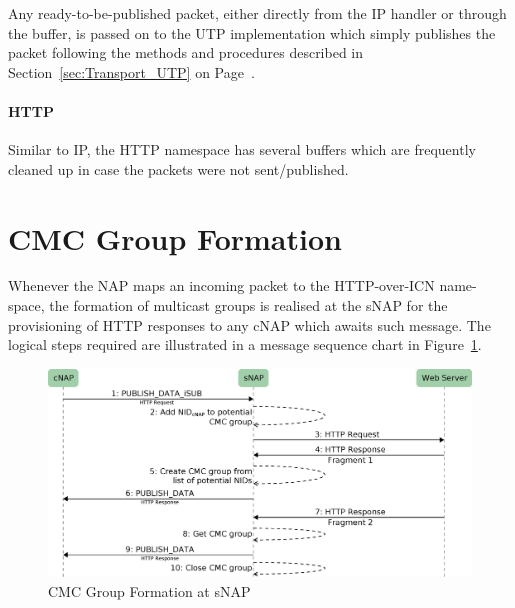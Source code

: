 \documentclass[a4paper,11pt,titlepage]{report}
\begin{document}
Any ready-to-be-published packet, either directly from the IP handler or through the buffer, is passed on to the \ac{UTP} implementation which simply publishes the packet following the methods and procedures described in Section~\ref{sec:Transport_UTP} on Page~\pageref{sec:Transport_UTP}.

\paragraph{HTTP}
Similar to IP, the HTTP namespace has several buffers which are frequently cleaned up in case the packets were not sent/published.
\section{\acl{CMC} Group Formation}
Whenever the NAP maps an incoming packet to the HTTP-over-ICN name-space, the formation of multicast groups is realised at the \ac{sNAP} for the provisioning of HTTP responses to any \ac{cNAP} which awaits such message. The logical steps required are illustrated in a message sequence chart in Figure~\ref{fig:CmcGroupManagement}.

\begin{figure}
  \begin{center}
    \includegraphics[width=\textwidth]{eps/cmcGroupManagement.eps}
    \caption{\acl{CMC} Group Formation at \acl{sNAP}}
    \label{fig:CmcGroupManagement}
  \end{center}
\end{figure}
\end{document}

